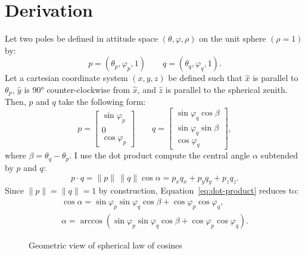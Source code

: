 \chapter{Derivation}\label{app:spherical-cosines}
Let two poles be defined in attitude space $(\theta,\varphi,\rho)$ on the unit sphere $(\rho=1)$ by:
\begin{equation}
    p=(\theta_p,\varphi_p,1)\qquad q=(\theta_q,\varphi_q,1).
\end{equation}
Let a cartesian coordinate system $(x,y,z)$ be defined such that $\hat x$ is parallel to $\theta_p$, $\hat y$ is \ang{90} counter-clockwise from $\hat x$, and $\hat z$ is parallel to the spherical zenith. Then, $p$ and $q$ take the following form: %
\begin{equation}
    p=
    \begin{bmatrix}
        \sin\varphi_p\\
        0\\
        \cos\varphi_p
    \end{bmatrix}
    \qquad
    q=
    \begin{bmatrix}
        \sin\varphi_q\cos\beta\\
        \sin\varphi_q\sin\beta\\
        \cos\varphi_q
    \end{bmatrix},
\end{equation}
where $\beta=\theta_q-\theta_p$. I use the dot product compute the central angle $\alpha$ subtended by $p$ and $q$:
\begin{equation}
    p\cdot q
    =\|p\|\,\|q\|\cos\alpha
    =p_{x}q_{x}
    +p_{y}q_{y}
    +p_{z}q_{z}.\label{eq:dot-product}
\end{equation}
Since $\|p\|=\|q\|=1$ by construction, Equation~\eqref{eq:dot-product} reduces to:
\begin{gather}
    \cos\alpha
    =\sin\varphi_p\sin\varphi_q\cos\beta
    +\cos\varphi_p\cos\varphi_q,\nonumber\\
    \alpha
    =\arccos(\sin\varphi_p\sin\varphi_q\cos\beta
    +\cos\varphi_p\cos\varphi_q).
\end{gather}

\begin{figure}
    \begin{center}
        \caption[Spherical law of cosines]{Geometric view of spherical law of cosines}%
        \label{fig:spherical-cosines}%
    \end{center}
\end{figure}

